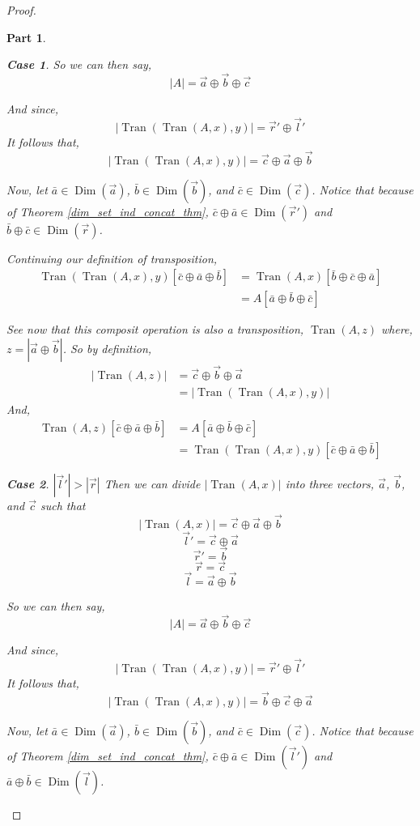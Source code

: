 \documentclass[12pt]{book}
\theoremstyle{definition}
\theoremstyle{plain}
\theoremstyle{ppart}
\newtheorem{ppart}{Part}
\theoremstyle{case}
\newtheorem{case}{Case}
\theoremstyle{solution}
\DeclareMathOperator{\Dim}{Dim}
\DeclareMathOperator{\Tran}{Tran}
\begin{document}
\begin{proof}
\begin{ppart}
\begin{case}
So we can then say,
\[ |A| = \vec{a} \oplus \vec{b} \oplus \vec{c} \]

And since,
\[ |\Tran(\Tran(A, x), y)| = \vec{r}' \oplus \vec{l}' \]
It follows that,
\[ |\Tran(\Tran(A, x), y)| = \vec{c} \oplus \vec{a} \oplus \vec{b} \]

Now, let $\bar{a} \in \Dim(\vec{a})$, $\bar{b} \in \Dim(\vec{b})$, and
$\bar{c} \in \Dim(\vec{c})$. Notice that because of Theorem 
\ref{dim_set_ind_concat_thm}, $\bar{c} \oplus \bar{a} \in \Dim(\vec{r}')$ and
$\bar{b} \oplus \bar{c} \in \Dim(\vec{r})$.

Continuing our definition of transposition,
\begin{align*}
  \Tran(\Tran(A, x), y)[\bar{c} \oplus \bar{a} \oplus \bar{b}]
  &=
  \Tran(A, x)[\bar{b} \oplus \bar{c} \oplus \bar{a}] \\
  &=
  A[\bar{a} \oplus \bar{b} \oplus \bar{c}]
\end{align*}

See now that this composit operation is also a transposition, $\Tran(A, z)$ where,
$z = |\vec{a} \oplus \vec{b}|$.
So by definition,
\begin{align*}
  |\Tran(A, z)|
  &=
  \vec{c} \oplus \vec{b} \oplus \vec{a} \\
  &=
  |\Tran(\Tran(A, x), y)|  
\end{align*}
And,
\begin{align*}
  \Tran(A, z)[\bar{c} \oplus \bar{a} \oplus \bar{b}]
  &=
  A[\bar{a} \oplus \bar{b} \oplus \bar{c}] \\
  &=
  \Tran(\Tran(A, x), y)[\bar{c} \oplus \bar{a} \oplus \bar{b}]
\end{align*}
\end{case}

\begin{case} $|\vec{l}'| > |\vec{r}|$
Then we can divide $|\Tran(A,x)|$ into three vectors, $\vec{a}$, $\vec{b}$, and $\vec{c}$
such that
\[ |\Tran(A,x)| = \vec{c} \oplus \vec{a} \oplus \vec{b} \]
\[ \vec{l}' = \vec{c} \oplus \vec{a} \]
\[ \vec{r}' = \vec{b} \]
\[ \vec{r} = \vec{c} \]
\[ \vec{l} = \vec{a} \oplus \vec{b} \]

So we can then say,
\[ |A| = \vec{a} \oplus \vec{b} \oplus \vec{c} \]

And since,
\[ |\Tran(\Tran(A, x), y)| = \vec{r}' \oplus \vec{l}' \]
It follows that,
\[ |\Tran(\Tran(A, x), y)| = \vec{b} \oplus \vec{c} \oplus \vec{a} \]

Now, let $\bar{a} \in \Dim(\vec{a})$, $\bar{b} \in \Dim(\vec{b})$, and
$\bar{c} \in \Dim(\vec{c})$. Notice that because of Theorem 
\ref{dim_set_ind_concat_thm}, $\bar{c} \oplus \bar{a} \in \Dim(\vec{l}')$ and
$\bar{a} \oplus \bar{b} \in \Dim(\vec{l})$.


\end{case}
\end{ppart}
\end{proof}
\end{document}
